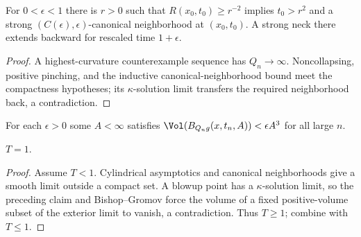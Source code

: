 \begin{theorem}
\label{thm:standard-solution-canonical-neighborhoods}
\label{R_0cannbhd}
For $0<\epsilon<1$ there is $r>0$ such that $R(x_0,t_0)\ge r^{-2}$
implies $t_0>r^2$ and a strong $(C(\epsilon),\epsilon)$-canonical
neighborhood at $(x_0,t_0)$. A strong neck there extends backward for
rescaled time $1+\epsilon$.
\end{theorem}
\begin{proof}
\sketch A highest-curvature counterexample sequence has $Q_n\to\infty$.
Noncollapsing, positive pinching, and the inductive canonical-neighborhood
bound meet the compactness hypotheses; its $\kappa$-solution limit transfers
the required neighborhood back, a contradiction.
\end{proof}

\begin{claim}
\label{claim:kappa-solution-volume-ratio-small}
For each $\epsilon>0$ some $A<\infty$ satisfies
$\Vol(B_{Q_ng}(x,t_n,A))<\epsilon A^3$ for all large $n$.
\end{claim}

\begin{theorem}[The standard flow exists exactly on $[0,1)$]
\label{thm:standard-solution-time-interval-one}
$T=1$.
\end{theorem}
\begin{proof}
\sketch Assume $T<1$. Cylindrical asymptotics and canonical neighborhoods
give a smooth limit outside a compact set. A blowup point has a
$\kappa$-solution limit, so the preceding claim and Bishop--Gromov force the
volume of a fixed positive-volume subset
of the exterior limit to vanish, a contradiction. Thus $T\ge1$; combine
with $T\le1$.
\end{proof}

